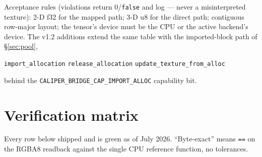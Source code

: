 \documentclass[11pt]{article}
\begin{document}
\noindent
Acceptance rules (violations return 0/\texttt{false} and log --- never a
misinterpreted texture): 2-D f32 for the mapped path; 3-D u8 for the direct
path; contiguous row-major layout; the tensor's device must be the CPU or the
active backend's device. The v1.2 additions extend the same table with the
imported-block path of \S\ref{sec:pool},
\begin{center}\footnotesize
\texttt{import\_allocation} \quad \texttt{release\_allocation} \quad
\texttt{update\_texture\_from\_alloc}
\end{center}
\noindent
behind the \texttt{CALIPER\_BRIDGE\_CAP\_IMPORT\_ALLOC} capability bit.

\section{Verification matrix}

Every row below shipped and is green as of July 2026. ``Byte-exact'' means
\texttt{==} on the RGBA8 readback against the single CPU reference function,
no tolerances.
\end{document}
